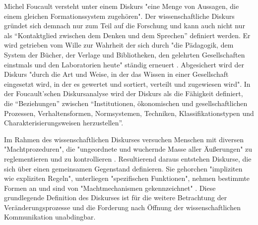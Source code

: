Michel Foucault versteht unter einem Diskurs "eine Menge von Aussagen, die einem gleichen Formationssystem zugehören"\cite{foucault_archaologie_1981}. Der wissenschaftliche Diskurs gründet sich demnach nur zum Teil auf die Forschung und kann auch nicht nur als “Kontaktglied zwischen dem Denken und dem Sprechen” \cite{foucault_ordnung_2003} definiert werden. Er wird getrieben vom Wille zur Wahrheit der sich durch "die Pädagogik, dem System der Bücher, der Verlage und Bibliotheken, den gelehrten Gesellschaften einstmals und den Laboratorien heute" ständig erneuert \cite{foucault_ordnung_2003}. Abgesichert wird der Diskurs "durch die Art und Weise, in der das Wissen in einer Gesellschaft eingesetzt wird, in der es gewertet und sortiert, verteilt und zugewiesen wird"\cite{foucault_ordnung_2003}. In der Foucault'schen Diskursanalyse wird der Diskurs als die Fähigkeit definiert, die “Beziehungen” zwischen “Institutionen, ökonomischen und gesellschaftlichen Prozessen, Verhaltensformen, Normsystemen, Techniken, Klassifikationstypen und Charakterisierungsweisen herzustellen”\cite{foucault_archaologie_1981}.

Im Rahmen des wissenschaftlichen Diskurses versuchen Menschen mit diversen "Machtprozeduren", die "ungeordnete und wuchernde Masse aller Äußerungen" zu reglementieren und zu kontrollieren \cite{Neymeyer_diskurs_2010}. Resultierend daraus entstehen Diskurse, die sich über einen gemeinsamen Gegenstand definieren. Sie gehorchen "impliziten wie expliziten Regeln", unterliegen "spezifischen Funktionen", nehmen bestimmte Formen an und sind von "Machtmechanismen gekennzeichnet" \cite{Neymeyer_diskurs_2010}. Diese grundlegende Definition des Diskurses ist für die weitere Betrachtung der Veränderungsprozesse und die Forderung nach Öffnung der wissenschaftlichen Kommunikation unabdingbar.
